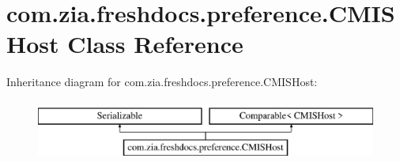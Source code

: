 \hypertarget{classcom_1_1zia_1_1freshdocs_1_1preference_1_1_c_m_i_s_host}{\section{com.\-zia.\-freshdocs.\-preference.\-C\-M\-I\-S\-Host Class Reference}
\label{classcom_1_1zia_1_1freshdocs_1_1preference_1_1_c_m_i_s_host}
}
Inheritance diagram for com.\-zia.\-freshdocs.\-preference.\-C\-M\-I\-S\-Host\-:\begin{figure}[H]
\begin{center}
\leavevmode
\includegraphics[height=2.000000cm]{classcom_1_1zia_1_1freshdocs_1_1preference_1_1_c_m_i_s_host}
\end{center}
\end{figure}
